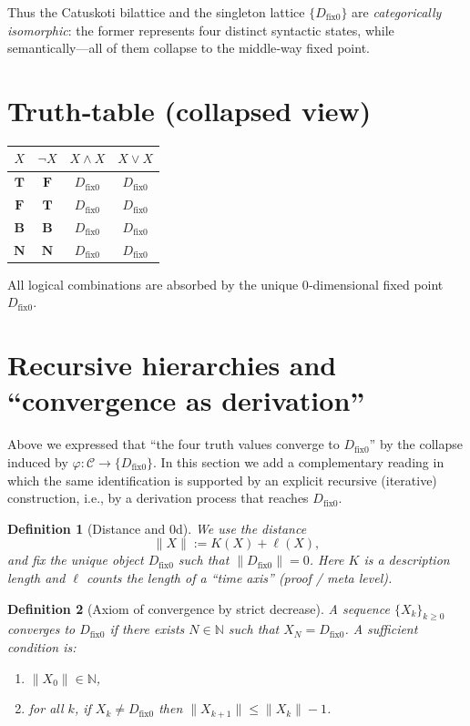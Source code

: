 \documentclass[12pt,a4paper]{article}
\newcommand{\dfix}{D_{\mathrm{fix}0}} %
\newcommand{\phiMap}{\varphi}            %
\newtheorem{definition}{Definition}[section]
\begin{document}
Thus the Catuskoti bilattice and the singleton lattice
$\{\dfix\}$ are \emph{categorically isomorphic}:
the former represents four distinct syntactic
states, while semantically—all of them collapse to the
middle‑way fixed point.

\section{Truth‑table (collapsed view)}

\begin{center}
\begin{tabular}{c|c|c|c}
$X$ & $\neg X$ & $X\wedge X$ & $X\vee X$ \\ \hline
$\mathbf{T}$ & $\mathbf{F}$ & $\dfix$ & $\dfix$ \\
$\mathbf{F}$ & $\mathbf{T}$ & $\dfix$ & $\dfix$ \\
$\mathbf{B}$ & $\mathbf{B}$ & $\dfix$ & $\dfix$ \\
$\mathbf{N}$ & $\mathbf{N}$ & $\dfix$ & $\dfix$
\end{tabular}
\end{center}
All logical combinations are absorbed by the unique
0‑dimensional fixed point $\dfix$.

\section{Recursive hierarchies and ``convergence as derivation''}

Above we expressed that ``the four truth values converge to $\dfix$'' by the collapse induced by
$\phiMap:\mathcal{C}\to\{\dfix\}$.
In this section we add a complementary reading in which the same identification is supported by
an explicit recursive (iterative) construction, i.e., by a derivation process that reaches $\dfix$.

\begin{definition}[Distance and $0$d]
We use the distance
\[
  \|X\|:=K(X)+\ell(X),
\]
and fix the unique object $\dfix$ such that $\|\dfix\|=0$.
Here $K$ is a description length and $\ell$ counts the length of a ``time axis'' (proof / meta level).
\end{definition}

\begin{definition}[Axiom of convergence by strict decrease]
A sequence $\{X_k\}_{k\ge0}$ \emph{converges} to $\dfix$ if there exists $N\in\mathbb{N}$ such that $X_N=\dfix$.
A sufficient condition is:
\begin{enumerate}
  \item $\|X_0\|\in\mathbb{N}$,
  \item for all $k$, if $X_k\neq\dfix$ then $\|X_{k+1}\|\le \|X_k\|-1$.
\end{enumerate}
\end{definition}
\end{document}
